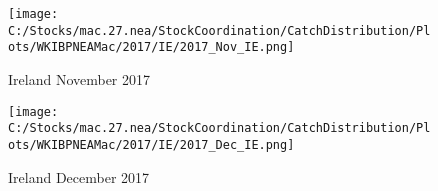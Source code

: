 \documentclass{article}
\begin{document}
\begin{figure}
	\centering
		\texttt{[image: C:/Stocks/mac.27.nea/StockCoordination/CatchDistribution/Plots/WKIBPNEAMac/2017/IE/2017\_Nov\_IE.png]}
	\caption{Ireland November 2017}
	\label{fig:2017_Nov_IE}
\end{figure}

\begin{figure}
	\centering
		\texttt{[image: C:/Stocks/mac.27.nea/StockCoordination/CatchDistribution/Plots/WKIBPNEAMac/2017/IE/2017\_Dec\_IE.png]}
	\caption{Ireland December 2017}
	\label{fig:2017_Dec_IE}
\end{figure}
\end{document}
